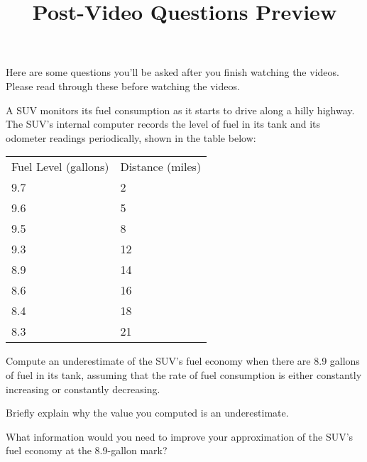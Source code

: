 \documentclass[handout]{ximera}
\title{Post-Video Questions Preview}
\begin{document}
\begin{abstract}
\end{abstract}


\maketitle

Here are some questions you’ll be asked after you finish watching the videos. Please read through these before watching the videos.

A SUV monitors its fuel consumption as it starts to drive along a hilly highway. The SUV’s internal computer records the level of fuel in its tank and its odometer readings periodically, shown in the table below:
\begin{table}[h!]
\centering
\begin{tabular}{ll}
\hline
Fuel Level (gallons) & Distance (miles) \\
9.7                  & 2                \\
9.6                  & 5                \\
9.5                  & 8                \\
9.3                  & 12               \\
8.9                  & 14               \\
8.6                  & 16               \\
8.4                  & 18               \\
8.3                  & 21               \\
\end{tabular}
\end{table}

Compute an underestimate of the SUV’s fuel economy when there are 8.9 gallons of fuel in its tank, assuming that the rate of fuel consumption is either constantly increasing or constantly decreasing.

Briefly explain why the value you computed is an underestimate.

What information would you need to improve your approximation of the SUV’s fuel economy at the 8.9-gallon mark?
\end{document}
